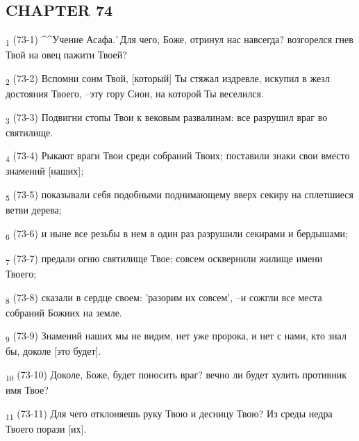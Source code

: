\subsection{CHAPTER 74}
\begin{tcolorbox}
\textsubscript{1} (73-1) ^^Учение Асафа.^^ Для чего, Боже, отринул нас навсегда? возгорелся гнев Твой на овец пажити Твоей?
\end{tcolorbox}
\begin{tcolorbox}
\textsubscript{2} (73-2) Вспомни сонм Твой, [который] Ты стяжал издревле, искупил в жезл достояния Твоего, --эту гору Сион, на которой Ты веселился.
\end{tcolorbox}
\begin{tcolorbox}
\textsubscript{3} (73-3) Подвигни стопы Твои к вековым развалинам: все разрушил враг во святилище.
\end{tcolorbox}
\begin{tcolorbox}
\textsubscript{4} (73-4) Рыкают враги Твои среди собраний Твоих; поставили знаки свои вместо знамений [наших];
\end{tcolorbox}
\begin{tcolorbox}
\textsubscript{5} (73-5) показывали себя подобными поднимающему вверх секиру на сплетшиеся ветви дерева;
\end{tcolorbox}
\begin{tcolorbox}
\textsubscript{6} (73-6) и ныне все резьбы в нем в один раз разрушили секирами и бердышами;
\end{tcolorbox}
\begin{tcolorbox}
\textsubscript{7} (73-7) предали огню святилище Твое; совсем осквернили жилище имени Твоего;
\end{tcolorbox}
\begin{tcolorbox}
\textsubscript{8} (73-8) сказали в сердце своем: 'разорим их совсем', --и сожгли все места собраний Божиих на земле.
\end{tcolorbox}
\begin{tcolorbox}
\textsubscript{9} (73-9) Знамений наших мы не видим, нет уже пророка, и нет с нами, кто знал бы, доколе [это будет].
\end{tcolorbox}
\begin{tcolorbox}
\textsubscript{10} (73-10) Доколе, Боже, будет поносить враг? вечно ли будет хулить противник имя Твое?
\end{tcolorbox}
\begin{tcolorbox}
\textsubscript{11} (73-11) Для чего отклоняешь руку Твою и десницу Твою? Из среды недра Твоего порази [их].
\end{tcolorbox}
